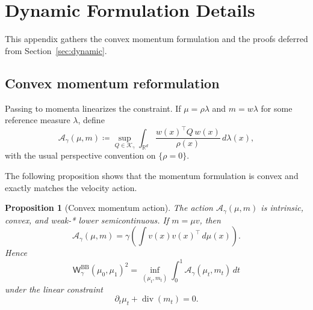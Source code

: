 \documentclass{article}
\newtheorem{proposition}[theorem]{Proposition}
\newcommand{\R}{\mathbb{R}}
\newcommand{\Wgbb}{\mathsf{W}_{\gamma}^{\mathrm{BB}}}
\newcommand{\divv}{\operatorname{div}}
\newcommand{\cK}{\mathcal K_\gamma}
\newcommand{\cA}{\mathcal A_\gamma}
\begin{document}
\section{Dynamic Formulation Details}
\label{app:dynamic-details}
This appendix gathers the convex momentum formulation and the proofs deferred from Section~\ref{sec:dynamic}.

\subsection{Convex momentum reformulation}

Passing to momenta linearizes the constraint. If $\mu=\rho\lambda$ and $m=w\lambda$ for some reference measure $\lambda$, define
$$
\cA(\mu,m)
\coloneqq 
\sup_{Q\in\cK}
\int_{\R^d}\frac{w(x)^\top Q\,w(x)}{\rho(x)}\,d\lambda(x),
$$
with the usual perspective convention on $\{\rho=0\}$.

The following proposition shows that the momentum formulation is convex and exactly matches the velocity action.

\begin{proposition}[Convex momentum action]
\label{prop:momentum}
The action $\cA(\mu,m)$ is intrinsic, convex, and weak-* lower semicontinuous. If $m=\mu v$, then
$$
\cA(\mu,m)
=
\gamma\!\left(
\int v(x)v(x)^\top\,d\mu(x)
\right).
$$
Hence
$$
\Wgbb(\mu_0,\mu_1)^2
=
\inf_{(\mu_t,m_t)}
\int_0^1 \cA(\mu_t,m_t)\,dt
$$
under the linear constraint
$$
\partial_t\mu_t+\divv(m_t)=0.
$$
\end{proposition}
\end{document}
